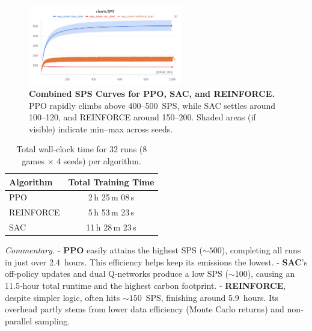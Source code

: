 \begin{figure} 
	\centering
	\includegraphics[width=0.6\textwidth]{figures/policy_comparison/policy_sps_comparison.png}
	\caption{\textbf{Combined SPS Curves for PPO, SAC, and REINFORCE.}
		PPO rapidly climbs above 400--500~SPS, while SAC settles around 100--120, and REINFORCE around 150--200. 
		Shaded areas (if visible) indicate min--max across seeds.}
	\label{fig:policy_sps_comparison}
\end{figure}

\begin{table} 
	\centering
	\caption{Total wall‐clock time for 32 runs (8 games × 4 seeds) per algorithm.}
	\label{tab:policy_training_time}
	\begin{tabular}{lc}
		\toprule
		\textbf{Algorithm} & \textbf{Total Training Time}\\
		\midrule
		PPO         & 2\,h 25\,m 08\,s \\
		REINFORCE   & 5\,h 53\,m 23\,s \\
		SAC         & 11\,h 28\,m 23\,s \\
		\bottomrule
	\end{tabular}
\end{table}

\noindent
\emph{Commentary.}
- \textbf{PPO} easily attains the highest SPS ($\sim500$), completing all runs in just over 2.4~hours. This efficiency helps keep its emissions the lowest.  
- \textbf{SAC}’s off‐policy updates and dual Q‐networks produce a low SPS ($\sim100$), causing an 11.5‐hour total runtime and the highest carbon footprint.  
- \textbf{REINFORCE}, despite simpler logic, often hits \(\sim150\)~SPS, finishing around 5.9~hours. Its overhead partly stems from lower data efficiency (Monte Carlo returns) and non‐parallel sampling.

